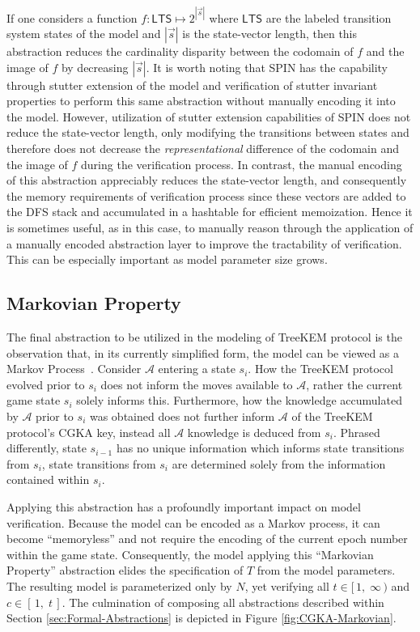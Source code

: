 \documentclass[authordraft,sigconf]{acmart}
\newcommand{\Adversary}{\ensuremath{\mathcal{A}}\xspace}
\newcommand{\NumericRange}[2]{\ensuremath{\left[\,#1,\; #2\,\right]}\xspace}
\newcommand{\NumericRangeOpenR}[2]{\ensuremath{[\,#1,\; #2\,)}\xspace}
\begin{document}
If one considers a function $f: \mathsf{LTS} \mapsto 2^{\left|\vec{s}\right|}$ where $\mathsf{LTS}$ are the labeled transition system states of the model and $\left|\vec{s}\right|$ is the state-vector length, then this abstraction reduces the cardinality disparity between the codomain of $f$ and the image of $f$ by decreasing $\left|\vec{s}\right|$.  
It is worth noting that SPIN has the capability through stutter extension of the model and verification of stutter invariant properties to perform this same abstraction without manually encoding it into the model.
However, utilization of stutter extension capabilities of SPIN does not reduce the state-vector length, only modifying the transitions between states and therefore does not decrease the \emph{representational} difference of the codomain and the image of $f$ during the verification process.
In contrast, the manual encoding of this abstraction appreciably reduces the state-vector length, and consequently the memory requirements of verification process since these vectors are added to the DFS stack and accumulated in a hashtable for efficient memoization.
Hence it is sometimes useful, as in this case, to manually reason through the application of a manually encoded abstraction layer to improve the tractability of verification.
This can be especially important as model parameter size grows.


\subsection{Markovian Property}

The final abstraction to be utilized in the modeling of TreeKEM protocol is the observation that, in its currently simplified form, the model can be viewed as a Markov Process~\cite{markov1906a}.
Consider \Adversary entering a \CGKAsec state $s_{i}$.
How the TreeKEM protocol evolved prior to $s_{i}$ does not inform the moves available to \Adversary, rather the current game state $s_{i}$ solely informs this.
Furthermore, how the knowledge accumulated by \Adversary prior to $s_{i}$ was obtained does not further inform \Adversary of the TreeKEM protocol's CGKA key, instead all \Adversary knowledge is deduced from $s_{i}$.
Phrased differently, state $s_{i-1}$ has no unique information which informs state transitions from $s_{i}$, state transitions from $s_{i}$ are determined solely from the information contained within $s_{i}$.

Applying this abstraction has a profoundly important impact on model verification.
Because the model can be encoded as a Markov process, it can become ``memoryless'' and not require the encoding of the current epoch number within the game state.
Consequently, the model applying this ``Markovian Property'' abstraction elides the specification of $T$ from the model parameters.
The resulting model is parameterized only by $N$, yet verifying all $t \in \NumericRangeOpenR{1}{\infty}$ and $c \in \NumericRange{1}{t}$.
The culmination of composing all abstractions described within Section \ref{sec:Formal-Abstractions} is depicted in Figure \ref{fig:CGKA-Markovian}.
\end{document}
